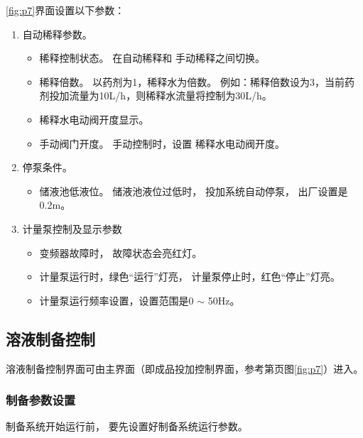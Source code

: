 \documentclass[UTF8,a4paper,12pt,titlepage]{ctexart}
\begin{document}
            \ref{fig:p7}界面设置以下参数：
            \begin{enumerate}
                \item   自动稀释参数。
                    \begin{itemize}
                        \item 稀释控制状态。
                            在自动稀释和 手动稀释之间切换。
                        \item 稀释倍数。
                        以药剂为1，稀释水为倍数。
                        例如：稀释倍数设为3，当前药剂投加流量为10L/h，则稀释水流量将控制为30L/h。
                        \item 稀释水电动阀开度显示。
                        \item 手动阀门开度。
                            手动控制时，设置 稀释水电动阀开度。
                    \end{itemize}
                \item 停泵条件。
                    \begin{itemize}
                    \item 储液池低液位。
                    储液池液位过低时，
                    投加系统自动停泵，
                    出厂设置是0.2m。
                    \end{itemize}
                \item 计量泵控制及显示参数
                    \begin{itemize}
                        \item 变频器故障时，
                            故障状态会亮红灯。
                        \item 计量泵运行时，绿色“运行”灯亮，
                            计量泵停止时，红色“停止”灯亮。
                        \item 计量泵运行频率设置，设置范围是0 $\sim$ 50Hz。
                    \end{itemize}
            \end{enumerate}


   \subsection{溶液制备控制}
       溶液制备控制界面可由主界面（即成品投加控制界面，参考第\pageref{fig:p7}页图\ref{fig:p7}）进入。

      \subsubsection{制备参数设置}
      制备系统开始运行前，
      要先设置好制备系统运行参数。
\end{document}
